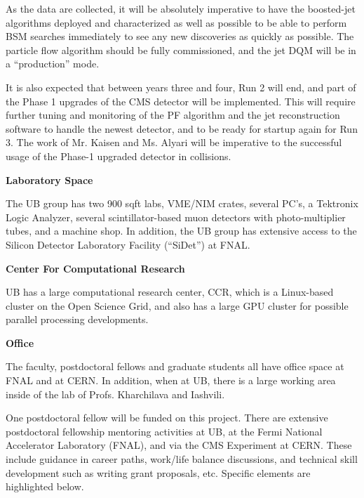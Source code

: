 \documentclass[12pt]{proposalnsf}
\begin{document}
As the data are collected, it will be absolutely imperative to have
the boosted-jet algorithms deployed and characterized as well as
possible to be able to perform BSM searches immediately to see any new
discoveries as quickly as possible. The particle flow algorithm should
be fully commissioned, and the jet DQM will be in a ``production''
mode. 

It is also expected that between years three and four, Run 2
will end, and part of the Phase 1 upgrades of the CMS detector will be
implemented. This will require further tuning and monitoring of the PF
algorithm and the jet reconstruction software to handle the newest
detector, and to be ready for startup again for Run 3. The work of
Mr. Kaisen and Ms. Alyari will be imperative to the successful usage
of the Phase-1 upgraded detector in collisions. 


\newpage
{}
\renewcommand{\thepage} {C--\arabic{page}}

\bigskip
{\bf Laboratory Space}

The UB group has two 900 sqft labs, VME/NIM crates,
several PC's, a Tektronix Logic Analyzer, several scintillator-based
muon detectors with photo-multiplier tubes, and a machine shop. 
In addition, the UB group has extensive access to the Silicon
Detector Laboratory Facility (``SiDet'') at FNAL. 

\bigskip
{\bf Center For Computational Research}

UB has a large computational research center, CCR, which is a
Linux-based cluster on the Open Science Grid, and also has a large GPU
cluster for possible parallel processing developments. 

\bigskip
{\bf Office}

The faculty, postdoctoral fellows and graduate students all have
office space at FNAL and at CERN. In addition, when at UB,
there is a large working area inside of the lab of Profs. Kharchilava
and Iashvili. 


\newpage
{}
\renewcommand{\thepage} {D--\arabic{page}}

One postdoctoral fellow will be funded on this project. There are
extensive postdoctoral fellowship mentoring activities at UB, at the
Fermi National Accelerator Laboratory (FNAL), and via the CMS
Experiment at CERN. These include guidance in career paths,
work/life balance discussions, and technical skill development such as
writing grant proposals, etc. Specific elements are highlighted
below. 
\end{document}
